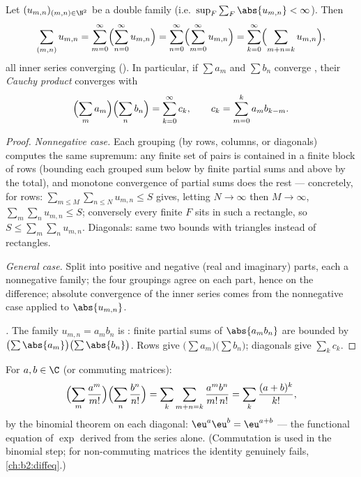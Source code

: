 \begin{theorem}\label{thm:b2:series:fubini}
Let $(u_{m,n})_{(m,n) \in \N^2}$ be a  double family (i.e.\
$\sup_F \sum_F \abs{u_{m,n}} < \infty$). Then\index{Fubini theorem
for series}
\[
\sum_{(m,n)} u_{m,n}
= \sum_{m=0}^{\infty}\Bigl(\sum_{n=0}^{\infty} u_{m,n}\Bigr)
= \sum_{n=0}^{\infty}\Bigl(\sum_{m=0}^{\infty} u_{m,n}\Bigr)
= \sum_{k=0}^{\infty}\Bigl(\sum_{m+n=k} u_{m,n}\Bigr),
\]
all inner series converging (). In particular, if $\sum
a_m$ and $\sum b_n$ converge , their \emph{Cauchy
product}\index{Cauchy product} converges \omterm{def:b2:series:def}{absolutely} with
\[
\Bigl(\sum_m a_m\Bigr)\Bigl(\sum_n b_n\Bigr)
= \sum_{k=0}^{\infty} c_k,
\qquad
c_k = \sum_{m=0}^{k} a_m b_{k-m} .
\]
\end{theorem}

\begin{proof}
\emph{Nonnegative case.} Each grouping (by rows, columns, or
diagonals) computes the same supremum: any finite set of pairs is
contained in a finite block of rows (bounding each grouped sum below
by finite partial sums and above by the total), and monotone
convergence of partial sums does the rest --- concretely, for rows:
$\sum_{m \leq M}\sum_{n \leq N} u_{m,n} \leq S$ gives, letting $N
\to \infty$ then $M \to \infty$, $\sum_m \sum_n u_{m,n} \leq S$;
conversely every finite $F$ sits in such a rectangle, so $S \leq
\sum_m\sum_n u_{m,n}$. Diagonals: same two bounds with triangles
instead of rectangles.

\emph{General case.} Split into positive and negative (real and
imaginary) parts, each a  nonnegative family; the four
groupings agree on each part, hence on the difference; absolute
convergence of the inner series comes from the nonnegative case
applied to $\abs{u_{m,n}}$.

\emph{.} The family $u_{m,n} = a_m b_n$ is :
finite partial sums of $\abs{a_mb_n}$ are bounded by
$\bigl(\sum\abs{a_m}\bigr)\bigl(\sum\abs{b_n}\bigr)$. Rows give
$\bigl(\sum a_m\bigr)\bigl(\sum b_n\bigr)$; diagonals give $\sum_k
c_k$.
\end{proof}

\begin{example}\label{ex:b2:series:exp}
For $a, b \in \C$ (or commuting matrices):
\[
\Bigl(\sum_m \frac{a^m}{m!}\Bigr)\Bigl(\sum_n
\frac{b^n}{n!}\Bigr)
= \sum_k \sum_{m+n=k} \frac{a^m b^n}{m!\,n!}
= \sum_k \frac{(a + b)^k}{k!},
\]
by the binomial theorem on each diagonal: $\eu^a \eu^b = \eu^{a+b}$
--- the functional equation of $\exp$ derived from the series alone.
(Commutation is used in the binomial step; for non-commuting
matrices the identity genuinely fails,
\cref{ch:b2:diffeq}.)
\end{example}

